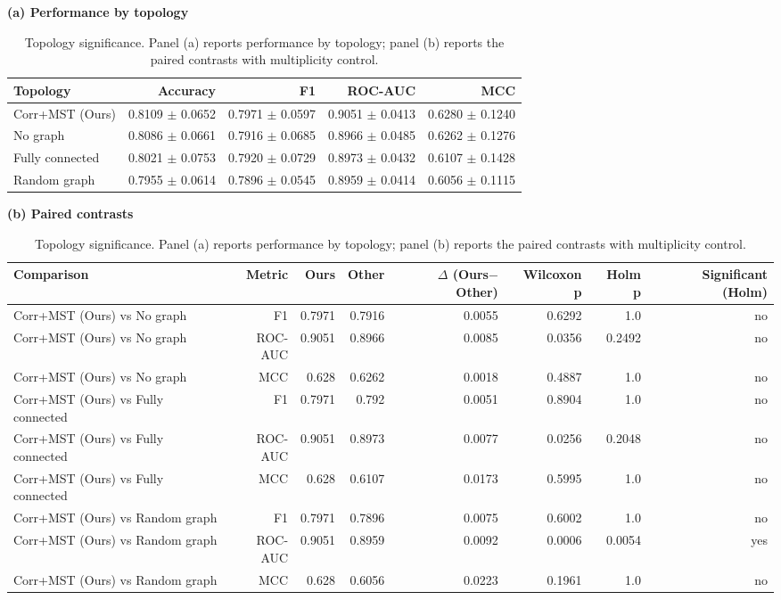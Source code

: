\begin{table}[t]
\centering
\caption{Topology significance. Panel (a) reports performance by topology; panel (b) reports the paired contrasts with multiplicity control.}
\label{tab:toposigperf}
\label{tab:toposig}
\footnotesize
\textbf{(a) Performance by topology}\\[2pt]
\begin{tabular}{lrrrr}
\toprule
Topology & Accuracy & F1 & ROC-AUC & MCC \\
\midrule
Corr+MST (Ours) & 0.8109 $\pm$ 0.0652 & 0.7971 $\pm$ 0.0597 & 0.9051 $\pm$ 0.0413 & 0.6280 $\pm$ 0.1240 \\
No graph & 0.8086 $\pm$ 0.0661 & 0.7916 $\pm$ 0.0685 & 0.8966 $\pm$ 0.0485 & 0.6262 $\pm$ 0.1276 \\
Fully connected & 0.8021 $\pm$ 0.0753 & 0.7920 $\pm$ 0.0729 & 0.8973 $\pm$ 0.0432 & 0.6107 $\pm$ 0.1428 \\
Random graph & 0.7955 $\pm$ 0.0614 & 0.7896 $\pm$ 0.0545 & 0.8959 $\pm$ 0.0414 & 0.6056 $\pm$ 0.1115 \\
\bottomrule
\end{tabular}
\vspace{7pt}
\textbf{(b) Paired contrasts}\\[2pt]
\begin{tabular}{lrrrrrrr}
\toprule
Comparison & Metric & Ours & Other & $\Delta$ (Ours$-$Other) & Wilcoxon p & Holm p & Significant (Holm) \\
\midrule
Corr+MST (Ours) vs No graph & F1 & 0.7971 & 0.7916 & 0.0055 & 0.6292 & 1.0 & no \\
Corr+MST (Ours) vs No graph & ROC-AUC & 0.9051 & 0.8966 & 0.0085 & 0.0356 & 0.2492 & no \\
Corr+MST (Ours) vs No graph & MCC & 0.628 & 0.6262 & 0.0018 & 0.4887 & 1.0 & no \\
Corr+MST (Ours) vs Fully connected & F1 & 0.7971 & 0.792 & 0.0051 & 0.8904 & 1.0 & no \\
Corr+MST (Ours) vs Fully connected & ROC-AUC & 0.9051 & 0.8973 & 0.0077 & 0.0256 & 0.2048 & no \\
Corr+MST (Ours) vs Fully connected & MCC & 0.628 & 0.6107 & 0.0173 & 0.5995 & 1.0 & no \\
Corr+MST (Ours) vs Random graph & F1 & 0.7971 & 0.7896 & 0.0075 & 0.6002 & 1.0 & no \\
Corr+MST (Ours) vs Random graph & ROC-AUC & 0.9051 & 0.8959 & 0.0092 & 0.0006 & 0.0054 & yes \\
Corr+MST (Ours) vs Random graph & MCC & 0.628 & 0.6056 & 0.0223 & 0.1961 & 1.0 & no \\
\bottomrule
\end{tabular}
\end{table}
